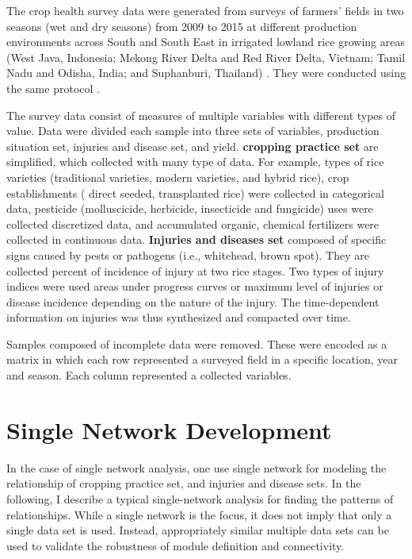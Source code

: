 The crop health survey data were generated from surveys of farmers' fields in two seasons (wet and dry seasons) from 2009 to 2015 at different production environments across South and South East in irrigated lowland rice growing areas (West Java, Indonesia; Mekong River Delta and Red River Delta, Vietnam; Tamil Nadu and Odisha, India; and Suphanburi, Thailand) . They were conducted using the same protocol \cite{Savary:1996ud}. 

The survey data consist of measures of multiple variables with different types of value. Data were divided each sample into three sets of variables, production situation set, injuries and disease set, and yield. \textbf{cropping practice set} are simplified, which collected with many type of data. For example, types of rice varieties (traditional varieties, modern varieties, and hybrid rice), crop establishments ( direct seeded, transplanted rice) were collected in categorical data, pesticide (molluscicide, herbicide, insecticide and fungicide) uses were collected discretized data, and accumulated organic, chemical fertilizers were collected in continuous data. \textbf{Injuries and diseases set} composed of specific signs caused by pests or pathogens (i.e., whitehead, brown spot). They are collected percent of incidence of injury at two rice stages. Two types of injury indices were used areas under progress curves or maximum level of injuries or disease incidence depending on the nature of the injury. The time-dependent information on injuries was thus synthesized and compacted over time.

Samples composed of incomplete data were removed. These were encoded as a matrix in which each row represented a surveyed field in a specific location, year and season. Each column represented a collected variables.


\section*{Single Network Development}

In the case of single network analysis, one use single network for modeling the relationship of cropping practice set, and injuries and disease sets. In the following, I describe a typical single-network analysis for finding the patterns of relationships.
While a single network is the focus, it does not imply that only a single data set is used. Instead, appropriately similar multiple data sets can be used to validate the robustness of module definition and connectivity.

